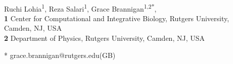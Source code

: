 \documentclass[10pt,letterpaper]{article}
\begin{document}
\vspace*{0.2in}

\begin{flushleft}
{\Large
\textbf{} %
}
\newline
\\
Ruchi Lohia\textsuperscript{1},
Reza Salari\textsuperscript{1},
Grace Brannigan\textsuperscript{1,2*},
\\
\bigskip
\textbf{1} Center for Computational and Integrative Biology, Rutgers University, Camden, NJ, USA
\\
\textbf{2} Department of Physics, Rutgers University, Camden, NJ, USA
\\
\bigskip

% 
%





* grace.brannigan@rutgers.edu(GB)

\end{flushleft}
\end{document}
